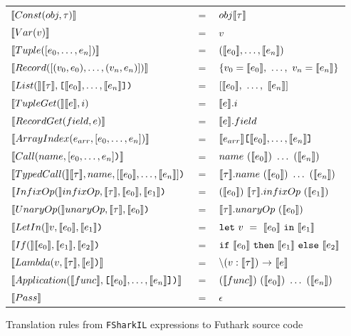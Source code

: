 \begin{figure}
  \centering
  \begin{tabular}{@{}l c l}%
  $\llbracket Const(obj, \tau ) \rrbracket$ & $=$ & $obj\llbracket \tau \rrbracket$ \\
  $\llbracket Var(v) \rrbracket$ & $=$ & $v$\\
  $\llbracket Tuple([e_0,\ldots, e_n]) \rrbracket$ & $=$ & $(\llbracket e_0 \rrbracket,\ldots, \llbracket e_n \rrbracket)$\\
  $\llbracket Record([(v_0, e_0),\ldots,(v_n,e_n)]) \rrbracket$ & $=$ & $\{v_0=\llbracket e_0 \rrbracket,~\ldots,~v_n=\llbracket e_n \rrbracket\}$ \\
  $\llbracket List( \rrbracket\llbracket \tau \rrbracket,\text{\ttfamily [}\llbracket e_0 \rrbracket,\ldots, \llbracket e_n \rrbracket\text{\ttfamily ]}\text{\ttfamily )}$ & $=$ & $[\llbracket e_0 \rrbracket,~\ldots,~\llbracket e_n \rrbracket]$\\
  $\llbracket TupleGet( \rrbracket\llbracket e \rrbracket, i{)}$ & $=$ & $\llbracket e \rrbracket.i$ \\
  $\llbracket RecordGet(field, e) \rrbracket$ & $=$ & $\llbracket e \rrbracket.field$ \\
  $\llbracket ArrayIndex(e_{arr},[e_0, \ldots, e_n]) \rrbracket$ & $=$ & $\llbracket e_{arr} \rrbracket\text{\ttfamily [}\llbracket e_0 \rrbracket,\ldots,\llbracket e_n \rrbracket\text{\ttfamily ]}$ \\
    
  $\llbracket Call(name, [e_0,\ldots,e_n]\text{\ttfamily )} \rrbracket$ & $=$ & $name~(\llbracket e_0 \rrbracket)~\ldots~(\llbracket e_n \rrbracket)$ \\
  $\llbracket TypedCall( \rrbracket\llbracket \tau \rrbracket,name, [\llbracket e_0 \rrbracket, \ldots, \llbracket e_n \rrbracket]\text{\ttfamily )}$ & $=$ & $\llbracket \tau \rrbracket.name~(\llbracket e_0 \rrbracket)~\ldots~(\llbracket e_n \rrbracket)$ \\
  $\llbracket InfixOp( \rrbracket infixOp, \llbracket \tau \rrbracket, \llbracket e_0 \rrbracket, \llbracket e_1 \rrbracket\text{\ttfamily )}$ & $=$ & $(\llbracket e_0 \rrbracket)~\llbracket \tau \rrbracket.infixOp~(\llbracket e_1 \rrbracket)$ \\
  $\llbracket UnaryOp( \rrbracket unaryOp, \llbracket \tau \rrbracket, \llbracket e_0 \rrbracket\text{\ttfamily )}$ & $=$ & $\llbracket \tau \rrbracket.unaryOp~(\llbracket e_0 \rrbracket)$ \\

  $\llbracket LetIn( \rrbracket v, \llbracket e_0 \rrbracket, \llbracket e_1 \rrbracket\text{\ttfamily )}$ & $=$ & $\mathtt{let}~v~=~\llbracket e_0 \rrbracket~\mathtt{in}~\llbracket e_1 \rrbracket$ \\

  $\llbracket If( \rrbracket\llbracket e_0 \rrbracket, \llbracket e_1 \rrbracket, \llbracket e_2 \rrbracket\text{\ttfamily )}$ & $=$ & $\mathtt{if}~\llbracket e_0 \rrbracket~\mathtt{then}~\llbracket e_1 \rrbracket~\mathtt{else}~\llbracket e_2 \rrbracket$ \\

  $\evals{Lambda(v, \evals{\tau}, \evals{e} \lit{)}}$ & $=$ & $\mathtt{\backslash}(v : \evals{\tau})~\mathtt{->}~\evals{e}$ \\
  $\evals{Application(\evals{func}, \lit{[}\evals{e_0},\ldots, \evals{e_n}\lit{])}}$ & $=$ & $(\evals{func})~(\evals{e_0})~\ldots~(\evals{e_n})$ \\
  $\evals{Pass}$ & $=$ & $\epsilon$ $$ \\
\end{tabular}
\caption{Translation rules from \texttt{FSharkIL} expressions to Futhark source code}
\label{fig:fsharkexprstofutharkcode}
\end{figure}



